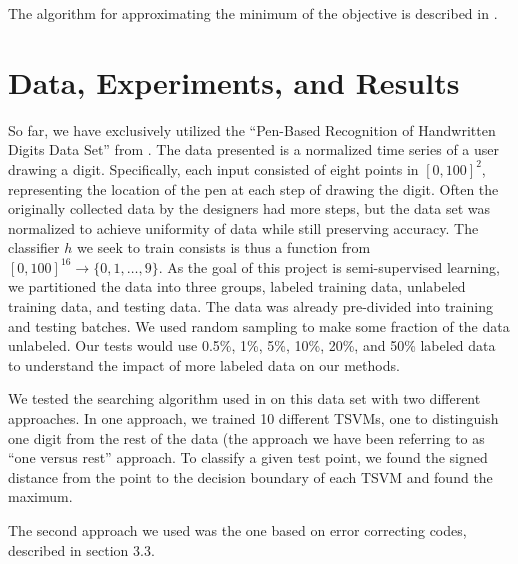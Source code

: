 \documentclass[11pt]{article}
\begin{document}
The algorithm for approximating the minimum of the objective is described
in \cite{joachims2003transductive}.


\section{Data, Experiments, and Results}

So far, we have exclusively utilized the ``Pen-Based Recognition of Handwritten Digits Data Set'' from \cite{Alpaydin:1998}. The data presented is a normalized time series of a user drawing a digit. Specifically, each input consisted of eight points in $[0, 100]^2$, representing the location of the pen at each step of drawing the digit. Often the originally collected data by the designers had more steps, but the data set was normalized to achieve uniformity of data while still preserving accuracy. The classifier $h$ we seek to train consists is thus a function from $[0, 100]^{16} \to \{0, 1, \hdots, 9\}$.  As the goal of this project is semi-supervised learning, we partitioned the data into three groups, labeled training data, unlabeled training data, and testing data. The data was already pre-divided into training and testing batches. We used random sampling to make some fraction of the data unlabeled. Our tests would use 0.5\%, 1\%, 5\%, 10\%, 20\%, and 50\% labeled data to understand the impact of more labeled data on our methods.

We tested the searching algorithm used in \cite{Joachims:1999} on this data set
with two different approaches.
In one approach, we trained 10 different TSVMs, one to distinguish one digit from the rest of the data (the approach we have been referring to as ``one versus
rest'' approach.
To classify a given test point, we found the signed distance from the point to the decision boundary of each TSVM and found the maximum.


The second approach we used was the one based on error correcting codes,
described in section 3.3.
\end{document}
